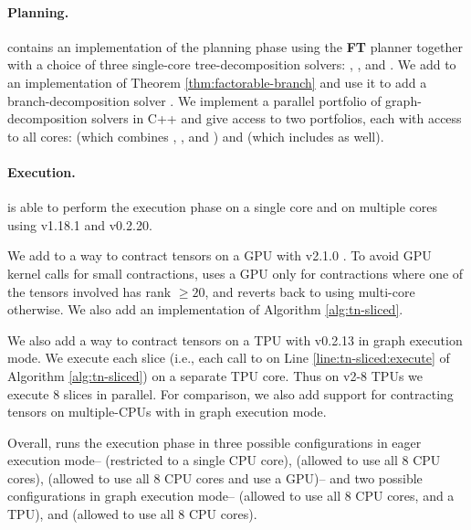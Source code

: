 \paragraph{Planning.} 
 contains an implementation of the planning phase using the \textbf{FT} planner together with a choice of three single-core tree-decomposition solvers:  \cite{Tamaki17},  \cite{HS18}, and  \cite{AMW17}. We add to  an implementation of Theorem \ref{thm:factorable-branch} and use it to add a branch-decomposition solver  \cite{hicks02}.
We implement a parallel portfolio of graph-decomposition solvers in C++ and give  access to two portfolios, each with access to all cores:  (which combines ,  , and ) and  (which includes  as well).

\paragraph{Execution.} 
 is able to perform the execution phase on a single core and on multiple cores using  v1.18.1 and  v0.2.20. 

We add to  a way to contract tensors on a GPU with  v2.1.0 \cite{ABCCDDDGII16}. To avoid GPU kernel calls for small contractions,  uses a GPU only for contractions where one of the tensors involved has rank $\geq 20$, and reverts back to using multi-core  otherwise. We also add an implementation of Algorithm \ref{alg:tn-sliced}.

We also add a way to contract tensors on a TPU with  v0.2.13 \cite{jax2018github} in graph execution mode. 
We execute each slice (i.e., each call to  on Line \ref{line:tn-sliced:execute} of Algorithm \ref{alg:tn-sliced}) on a separate TPU core. 
Thus on v2-8 TPUs we execute 8 slices in parallel. 
For comparison, we also add support for contracting tensors on multiple-CPUs with  in graph execution mode.

Overall,  runs the execution phase in three possible configurations in eager execution mode--  (restricted to a single CPU core),  (allowed to use all 8 CPU cores),  (allowed to use all 8 CPU cores and use a GPU)-- and two possible configurations in graph execution mode--  (allowed to use all 8 CPU cores, and a TPU), and  (allowed to use all 8 CPU cores).

